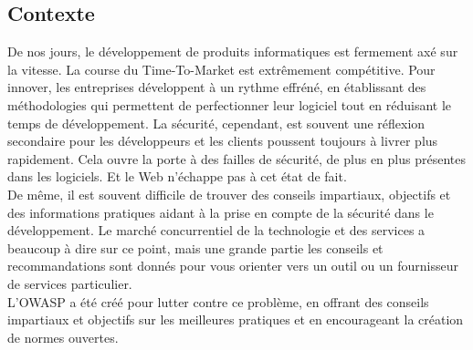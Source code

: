 \subsection{Contexte}
De nos jours, le développement de produits informatiques est fermement axé sur la vitesse. La course du Time-To-Market est extrêmement compétitive. Pour innover, les entreprises développent à un rythme effréné, en établissant des méthodologies qui permettent de perfectionner leur logiciel tout en réduisant le temps de développement. La sécurité, cependant, est souvent une réflexion secondaire pour les développeurs et les clients poussent toujours à livrer plus rapidement. Cela ouvre la porte à des failles de sécurité, de plus en plus présentes dans les logiciels. Et le Web n’échappe pas à cet état de fait.\\ 
De même, il est souvent difficile de trouver des conseils impartiaux, objectifs et des informations pratiques aidant à la prise en compte de la sécurité dans le développement. Le marché concurrentiel de la technologie et des services a beaucoup à dire sur ce point, mais une grande partie les conseils et recommandations sont donnés pour vous orienter vers un outil ou un fournisseur de services particulier.\\
L'OWASP a été créé pour lutter contre ce problème, en offrant des conseils impartiaux et objectifs sur les meilleures pratiques et en encourageant la création de normes ouvertes.


